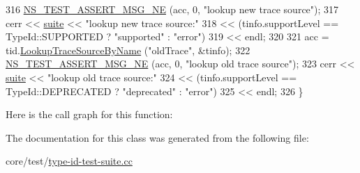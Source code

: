 \begin{DoxyCode}
316   \hyperlink{group__testing_ga73d66fb0050a5111453fd144e767b91a}{NS\_TEST\_ASSERT\_MSG\_NE} (acc, 0, \textcolor{stringliteral}{"lookup new trace source"});
317   cerr << \hyperlink{type-id-test-suite_8cc_ab4acb0fe33ca0947f675eed6196ed8ca}{suite} << \textcolor{stringliteral}{"lookup new trace source:"}
318        << (tinfo.supportLevel == TypeId::SUPPORTED ? \textcolor{stringliteral}{"supported"} : \textcolor{stringliteral}{"error"})
319        << endl;
320 
321   acc = tid.\hyperlink{classns3_1_1TypeId_a9b846d40a381142dc29f4dcd9b905c7f}{LookupTraceSourceByName} (\textcolor{stringliteral}{"oldTrace"}, &tinfo);
322   \hyperlink{group__testing_ga73d66fb0050a5111453fd144e767b91a}{NS\_TEST\_ASSERT\_MSG\_NE} (acc, 0, \textcolor{stringliteral}{"lookup old trace source"});
323   cerr << \hyperlink{type-id-test-suite_8cc_ab4acb0fe33ca0947f675eed6196ed8ca}{suite} << \textcolor{stringliteral}{"lookup old trace source:"}
324        << (tinfo.supportLevel == TypeId::DEPRECATED ? \textcolor{stringliteral}{"deprecated"} : \textcolor{stringliteral}{"error"})
325        << endl;
326 \}
\end{DoxyCode}


Here is the call graph for this function\+:




The documentation for this class was generated from the following file\+:\begin{DoxyCompactItemize}
\item 
core/test/\hyperlink{type-id-test-suite_8cc}{type-\/id-\/test-\/suite.\+cc}\end{DoxyCompactItemize}
